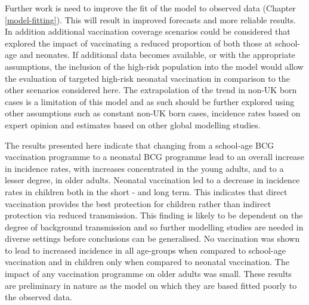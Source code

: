 \documentclass[11pt,twoside]{bristolthesis}
\begin{document}
  Further work is need to improve the fit of the model to observed data (Chapter \ref{model-fitting}). This will result in improved forecasts and more reliable results. In addition additional vaccination coverage scenarios could be considered that explored the impact of vaccinating a reduced proportion of both those at school-age and neonates. If additional data becomes available, or with the appropriate assumptions, the inclusion of the high-risk population into the model would allow the evaluation of targeted high-risk neonatal vaccination in comparison to the other scenarios considered here. The extrapolation of the trend in non-UK born cases is a limitation of this model and as such should be further explored using other assumptions such as constant non-UK born cases, incidence rates based on expert opinion and estimates based on other global modelling studies.
  
  The results presented here indicate that changing from a school-age BCG vaccination programme to a neonatal BCG programme lead to an overall increase in incidence rates, with increases concentrated in the young adults, and to a lesser degree, in older adults. Neonatal vaccination led to a decrease in incidence rates in children both in the short - and long term. This indicates that direct vaccination provides the best protection for children rather than indirect protection via reduced transmission. This finding is likely to be dependent on the degree of background transmission and so further modelling studies are needed in diverse settings before conclusions can be generalised. No vaccination was shown to lead to increased incidence in all age-groups when compared to school-age vaccination and in children only when compared to neonatal vaccination. The impact of any vaccination programme on older adults was small. These results are preliminary in nature as the model on which they are based fitted poorly to the observed data.
  
\end{document}
